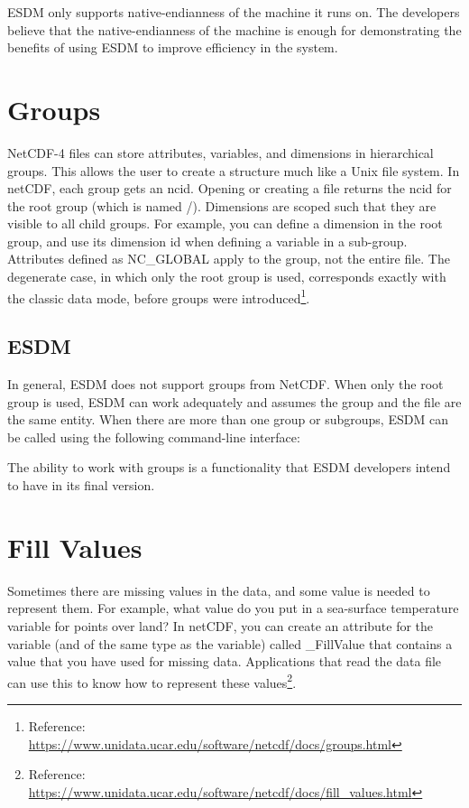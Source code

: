 \tab
ESDM only supports native-endianness of the machine it runs on. The developers believe that the native-endianness of the machine is enough for demonstrating the benefits of using ESDM to improve efficiency in the system.

\section{Groups}

\tab
NetCDF-4 files can store attributes, variables, and dimensions in hierarchical groups. This allows the user to create a structure much like a Unix file system. In netCDF, each group gets an ncid. Opening or creating a file returns the ncid for the root group (which is named /). Dimensions are scoped such that they are visible to all child groups. For example, you can define a dimension in the root group, and use its dimension id when defining a variable in a sub-group. Attributes defined as NC\_GLOBAL apply to the group, not the entire file. The degenerate case, in which only the root group is used, corresponds exactly with the classic data mode, before groups were introduced\footnote{Reference: \url{https://www.unidata.ucar.edu/software/netcdf/docs/groups.html}}.

\subsection{ESDM}

\tab
In general, ESDM does not support groups from NetCDF. When only the root group is used, ESDM can work adequately and assumes the group and the file are the same entity. When there are more than one group or subgroups, ESDM can be called using the following command-line interface:

\tocheck

The ability to work with groups is a functionality that ESDM developers intend to have in its final version.

\section{Fill Values}

\tab
Sometimes there are missing values in the data, and some value is needed to represent them. For example, what value do you put in a sea-surface temperature variable for points over land? In netCDF, you can create an attribute for the variable (and of the same type as the variable) called \_FillValue that contains a value that you have used for missing data. Applications that read the data file can use this to know how to represent these values\footnote{Reference: \url{https://www.unidata.ucar.edu/software/netcdf/docs/fill_values.html}}.

